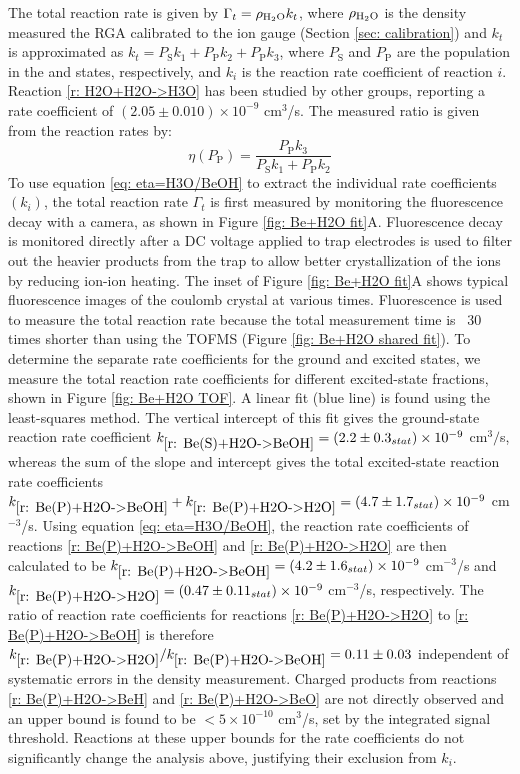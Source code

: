 The total reaction rate is given by $\Gamma_t = \rho_{\ce{H2O}} k_t$, where $\rho_{\ce{H2O}}$ is the  density measured the RGA calibrated to the ion gauge (Section \ref{sec: calibration}) and $k_t$ is approximated as $k_t = P_\text{S} k_1 + P_\text{P} k_2 + P_\text{P} k_3$, where $P_\text{S}$ and $P_\text{P}$ are the  population in the  and  states, respectively, and $k_i$ is the reaction rate coefficient of reaction $i$. Reaction \cref{r: H2O+H2O->H3O} has been studied by other groups, reporting a rate coefficient of $(2.05 \pm 0.010) \times 10^{-9}$ cm$^3$/s.\cite{Huntress2004} The measured  ratio is given from the reaction rates by:
\begin{equation}
	\eta(P_\text{P}) = \frac{P_\text{P} k_3}{P_\text{S} k_1 + P_\text{P} k_2}
	\label{eq: eta=H3O/BeOH}
\end{equation}
To use equation \ref{eq: eta=H3O/BeOH} to extract the individual rate coefficients $(k_i)$, the total reaction rate $\Gamma_t$ is first measured by monitoring the  fluorescence decay with a camera, as shown in Figure \ref{fig: Be+H2O fit}A. Fluorescence decay is monitored directly after a DC voltage applied to trap electrodes is used to filter out the heavier products from the trap to allow better crystallization of the  ions by reducing ion-ion heating.\cite{Chen2013} The inset of Figure \ref{fig: Be+H2O fit}A shows typical fluorescence images of the  coulomb crystal at various times. Fluorescence is used to measure the total reaction rate because the total measurement time is ~30 times shorter than using the TOFMS (Figure \ref{fig: Be+H2O shared fit}). To determine the separate rate coefficients for the  ground and excited states, we measure the total reaction rate coefficients for different excited-state fractions, shown in Figure \ref{fig: Be+H2O TOF}. A linear fit (blue line) is found using the least-squares method. The vertical intercept of this fit gives the  ground-state reaction rate coefficient $k_{\ref{r: Be(S)+H2O->BeOH}}=(2.2 \pm 0.3_{stat}) \times 10^{-9}$ cm$^3/$s, whereas the sum of the slope and intercept gives the total excited-state  reaction rate coefficients $k_{\ref{r: Be(P)+H2O->BeOH}} + k_{\ref{r: Be(P)+H2O->H2O}} = (4.7 \pm 1.7_{stat}) \times 10^{-9}$ cm$^{-3}$/s. Using equation \ref{eq: eta=H3O/BeOH}, the reaction rate coefficients of reactions \ref{r: Be(P)+H2O->BeOH} and \ref{r: Be(P)+H2O->H2O} are then calculated to be $k_{\ref{r: Be(P)+H2O->BeOH}} = (4.2 \pm 1.6_{stat}) \times 10^{-9}$ cm$^{-3}$/s and $k_{\ref{r: Be(P)+H2O->H2O}} = (0.47 \pm 0.11_{stat}) \times 10^{-9}$ cm$^{-3}$/s, respectively. The ratio of reaction rate coefficients for reactions \ref{r: Be(P)+H2O->H2O} to \ref{r: Be(P)+H2O->BeOH} is therefore $k_{\ref{r: Be(P)+H2O->H2O}}/k_{\ref{r: Be(P)+H2O->BeOH}} = 0.11 \pm 0.03$ independent of systematic errors in the density measurement. Charged products from reactions \ref{r: Be(P)+H2O->BeH} and \ref{r: Be(P)+H2O->BeO} are not directly observed and an upper bound is found to be $<5\times10^{-10}$ cm$^3$/s, set by the integrated signal threshold. Reactions at these upper bounds for the rate coefficients do not significantly change the analysis above, justifying their exclusion from $k_i$.

